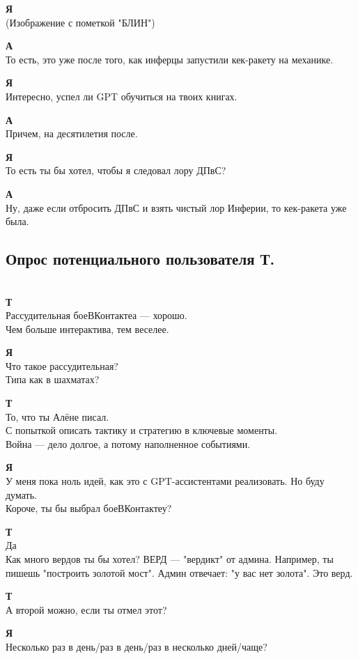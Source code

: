 \textbf{Я}\\
(Изображение с пометкой "БЛИН")

\textbf{А}\\
То есть, это уже после того, как инферцы запустили кек-ракету на механике.

\textbf{Я}\\
Интересно, успел ли GPT обучиться на твоих книгах.

\textbf{А}\\
Причем, на десятилетия после.

\textbf{Я}\\
То есть ты бы хотел, чтобы я следовал лору ДПвС?

\textbf{А}\\
Ну, даже если отбросить ДПвС и взять чистый лор Инферии, то кек-ракета уже была.

\subsection{Опрос потенциального пользователя Т.}\\
\textbf{Т}\\
Рассудительная боеВКонтактеа — хорошо.\\
Чем больше интерактива, тем веселее.

\textbf{Я}\\
Что такое рассудительная?\\
Типа как в шахматах?

\textbf{Т}\\
То, что ты Алёне писал.\\
С попыткой описать тактику и стратегию в ключевые моменты.\\
Война — дело долгое, а потому наполненное событиями.

\textbf{Я}\\
У меня пока ноль идей, как это с GPT-ассистентами реализовать. Но буду думать.\\
Короче, ты бы выбрал боеВКонтактеу?

\textbf{Т}\\
Да\\
Как много вердов ты бы хотел? ВЕРД — "вердикт" от админа. Например, ты пишешь "построить золотой мост". Админ отвечает: "у вас нет золота". Это верд.

\textbf{Т}\\
А второй можно, если ты отмел этот?

\textbf{Я}\\
Несколько раз в день/раз в день/раз в несколько дней/чаще?

